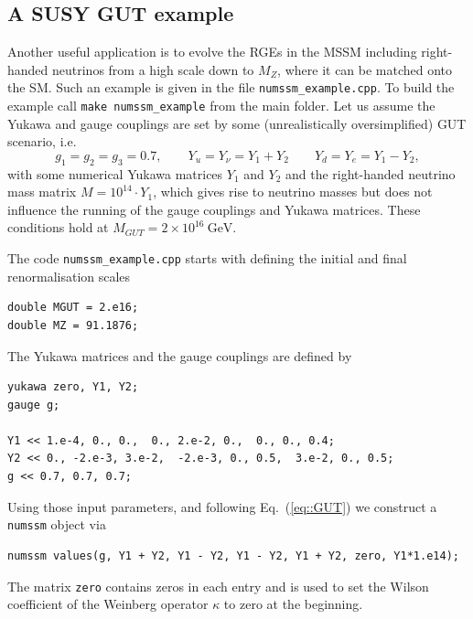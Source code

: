 \documentclass[11pt,a4paper]{article}
\begin{document}
\subsection{\label{sec::mssm_example} A SUSY GUT example}
Another useful application is to evolve the RGEs in the MSSM including right-handed neutrinos from a high scale down to $M_Z$, where it can be matched onto the SM. Such an example is given in the file \texttt{numssm\_example.cpp}.
To build the example call \texttt{make numssm\_example} from the main folder.
Let us assume the Yukawa and gauge couplings are set by some (unrealistically oversimplified) GUT scenario, i.e.
\begin{equation}
g_1 = g_2 = g_3 = 0.7, \qquad Y_u = Y_\nu = Y_1 + Y_2 \qquad Y_d = Y_e = Y_1 - Y_2, 
\label{eq::GUT}
\end{equation}
with some numerical Yukawa matrices $Y_1$ and $Y_2$ and the right-handed neutrino mass matrix $M = 10^{14}\cdot Y_1$, which gives rise to neutrino masses but
does not influence the running of the gauge couplings and Yukawa matrices. These conditions hold at $M_{GUT} = 2\times 10^{16}\ \mathrm{GeV}$.


The code \texttt{numssm\_example.cpp} starts with defining the initial and final renormalisation scales
\begin{lstlisting}
double MGUT = 2.e16;
double MZ = 91.1876;
\end{lstlisting}
The Yukawa matrices and the gauge couplings are defined by
\begin{lstlisting}
yukawa zero, Y1, Y2;
gauge g;

Y1 << 1.e-4, 0., 0.,  0., 2.e-2, 0.,  0., 0., 0.4;
Y2 << 0., -2.e-3, 3.e-2,  -2.e-3, 0., 0.5,  3.e-2, 0., 0.5;
g << 0.7, 0.7, 0.7;
\end{lstlisting}

Using those input parameters, and following Eq.~(\ref{eq::GUT}) we construct a \texttt{numssm} object via
\begin{lstlisting}
numssm values(g, Y1 + Y2, Y1 - Y2, Y1 - Y2, Y1 + Y2, zero, Y1*1.e14); 
 \end{lstlisting}
 The matrix \texttt{zero} contains zeros in each entry and is used to set the Wilson coefficient of the Weinberg operator $\kappa$ to zero at the beginning.
 
\end{document}
